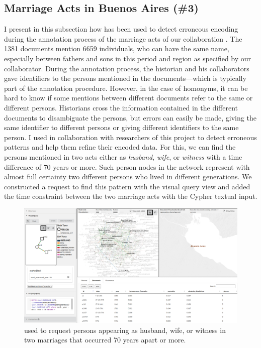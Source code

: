 \subsection{Marriage Acts in Buenos Aires (\#3)}\label{subsec:usecase-BA}
I present in this subsection how \combinet has been used to detect erroneous encoding during the annotation process of the marriage acts of our collaboration \zacarias.
The 1381 documents mention 6659 individuals, who can have the same name, especially between fathers and sons in this period and region as specified by our collaborator.
During the annotation process, the historian and his collaborators gave identifiers to the persons mentioned in the documents---which is typically part of the annotation procedure.
However, in the case of homonyms, it can be hard to know if some mentions between different documents refer to the same or different persons.
Historians cross the information contained in the different documents to disambiguate the persons\cite{winchesterLinkageHistoricalRecords1970}, but errors can easily be made, \ie giving the same identifier to different persons or giving different identifiers to the same person.
I used \combinet in collaboration with researchers of this project to detect erroneous patterns and help them refine their encoded data.
For this, we can find the persons mentioned in two acts either as \textit{husband}, \textit{wife}, or \textit{witness} with a time difference of 70 years or more.
Such person nodes in the network represent with almost full certainty two different persons who lived in different generations.
We constructed a request to find this pattern with the visual query view and added the time constraint between the two marriage acts with the Cypher textual input.
\begin{figure}[!ht]
    \centering
    \includegraphics[width=\linewidth]{static/figures/ComBiNet/BuenosAires_correction}
    \caption{\name used to request persons appearing as husband, wife, or witness in two marriages that occurred 70 years apart or more.}\label{fig:combinet-BuenosAires-correction}
\end{figure}
